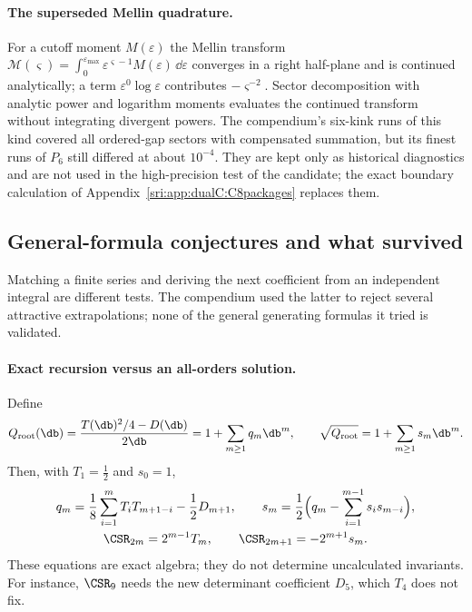 \paragraph{The superseded Mellin quadrature.} For a cutoff moment $M(\varepsilon)$ the Mellin transform
$\mathcal M(\varsigma)=\int_0^{\varepsilon_{\max}}\varepsilon^{\varsigma-1}M(\varepsilon)\,\dd\varepsilon$ converges
in a right half-plane and is continued analytically; a term $\varepsilon^0\log\varepsilon$ contributes
$-\varsigma^{-2}$. Sector
decomposition with analytic power and logarithm moments evaluates the continued transform without integrating
divergent powers. The compendium's six-kink runs of this kind covered all ordered-gap sectors with compensated
summation, but its finest runs of $P_6$ still differed at about $10^{-4}$. They are kept only as historical
diagnostics and are not used in the high-precision test of the candidate; the exact boundary calculation of
Appendix~\ref{sri:app:dualC:C8packages} replaces them.

\subsection{General-formula conjectures and what survived}\label{sri:app:dualC:conjectures}
Matching a finite series and deriving the next coefficient from an independent integral are different tests. The
compendium used the latter to reject several attractive extrapolations; none of the general generating formulas it
tried is validated.

\paragraph{Exact recursion versus an all-orders solution.} Define
\begin{equation}
 Q_{\rm root}(\db)=\frac{T(\db)^2/4-D(\db)}{2\db}=1+\sum_{m\ge1}q_m\db^m,\qquad
 \sqrt{Q_{\rm root}}=1+\sum_{m\ge1}s_m\db^m .
\end{equation}
Then, with $T_1=\frac12$ and $s_0=1$,
\begin{equation}
\begin{gathered}
 q_m=\frac18\sum_{i=1}^mT_iT_{m+1-i}-\frac12D_{m+1},\qquad
 s_m=\frac12\Bigl(q_m-\sum_{i=1}^{m-1}s_is_{m-i}\Bigr),\\
 \CSR_{2m}=2^{m-1}T_m,\qquad \CSR_{2m+1}=-2^{m+1}s_m .
\end{gathered}
 \label{sri:eq:dualC:allrecursion}
\end{equation}
These equations are exact algebra; they do not determine uncalculated invariants. For instance, $\CSR_9$ needs the new
determinant coefficient $D_5$, which $T_4$ does not fix.


